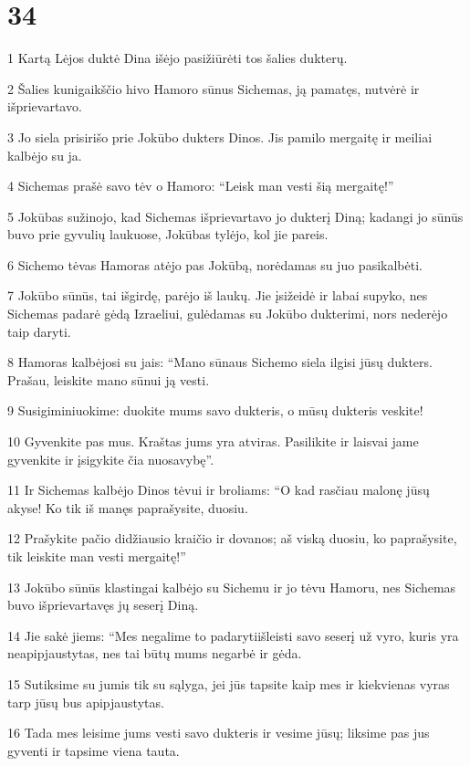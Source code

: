 \chapter{34}


\par 1 Kartą Lėjos duktė Dina išėjo pasižiūrėti tos šalies dukterų. 
\par 2 Šalies kunigaikščio hivo Hamoro sūnus Sichemas, ją pamatęs, nutvėrė ir išprievartavo. 
\par 3 Jo siela prisirišo prie Jokūbo dukters Dinos. Jis pamilo mergaitę ir meiliai kalbėjo su ja. 
\par 4 Sichemas prašė savo tėv o Hamoro: “Leisk man vesti šią mergaitę!” 
\par 5 Jokūbas sužinojo, kad Sichemas išprievartavo jo dukterį Diną; kadangi jo sūnūs buvo prie gyvulių laukuose, Jokūbas tylėjo, kol jie pareis. 
\par 6 Sichemo tėvas Hamoras atėjo pas Jokūbą, norėdamas su juo pasikalbėti. 
\par 7 Jokūbo sūnūs, tai išgirdę, parėjo iš laukų. Jie įsižeidė ir labai supyko, nes Sichemas padarė gėdą Izraeliui, gulėdamas su Jokūbo dukterimi, nors nederėjo taip daryti. 
\par 8 Hamoras kalbėjosi su jais: “Mano sūnaus Sichemo siela ilgisi jūsų dukters. Prašau, leiskite mano sūnui ją vesti. 
\par 9 Susigiminiuokime: duokite mums savo dukteris, o mūsų dukteris veskite! 
\par 10 Gyvenkite pas mus. Kraštas jums yra atviras. Pasilikite ir laisvai jame gyvenkite ir įsigykite čia nuosavybę”. 
\par 11 Ir Sichemas kalbėjo Dinos tėvui ir broliams: “O kad rasčiau malonę jūsų akyse! Ko tik iš manęs paprašysite, duosiu. 
\par 12 Prašykite pačio didžiausio kraičio ir dovanos; aš viską duosiu, ko paprašysite, tik leiskite man vesti mergaitę!” 
\par 13 Jokūbo sūnūs klastingai kalbėjo su Sichemu ir jo tėvu Hamoru, nes Sichemas buvo išprievartavęs jų seserį Diną. 
\par 14 Jie sakė jiems: “Mes negalime to padaryti­išleisti savo seserį už vyro, kuris yra neapipjaustytas, nes tai būtų mums negarbė ir gėda. 
\par 15 Sutiksime su jumis tik su sąlyga, jei jūs tapsite kaip mes ir kiekvienas vyras tarp jūsų bus apipjaustytas. 
\par 16 Tada mes leisime jums vesti savo dukteris ir vesime jūsų; liksime pas jus gyventi ir tapsime viena tauta. 
